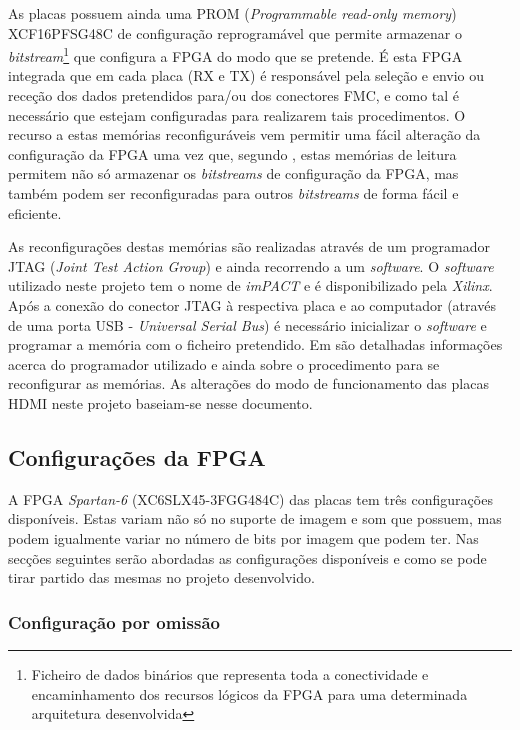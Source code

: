 As placas possuem ainda uma PROM (\textit{Programmable read-only memory}) XCF16PFSG48C de configuração reprogramável que permite armazenar o \textit{bitstream}\footnote{Ficheiro de dados binários que representa toda a conectividade e encaminhamento dos recursos lógicos da FPGA para uma determinada arquitetura desenvolvida} que configura a FPGA do modo que se pretende. É esta FPGA integrada que em cada placa (RX e TX) é responsável pela seleção e envio ou receção dos dados pretendidos para/ou dos conectores FMC, e como tal é necessário que estejam configuradas para realizarem tais procedimentos. O recurso a estas memórias reconfiguráveis vem permitir uma fácil alteração da configuração da FPGA uma vez que, segundo \cite{R026}, estas memórias de leitura permitem não só armazenar os \textit{bitstreams} de configuração da FPGA, mas também podem ser reconfiguradas para outros \textit{bitstreams} de forma fácil e eficiente.

As reconfigurações destas memórias são realizadas através de um programador JTAG (\textit{Joint Test Action Group}) e ainda recorrendo a um \textit{software}. O \textit{software} utilizado neste projeto tem o nome de \textit{imPACT} e é disponibilizado pela \textit{Xilinx}. Após a conexão do conector JTAG à respectiva placa e ao computador (através de uma porta USB - \textit{Universal Serial Bus}) é necessário inicializar o \textit{software} e programar a memória com o ficheiro pretendido. Em \cite{R025} são detalhadas informações acerca do programador utilizado e ainda sobre o procedimento para se reconfigurar as memórias. As alterações do modo de funcionamento das placas HDMI neste projeto baseiam-se nesse documento.

\subsection{Configurações da FPGA} \label{subsec:HDMIconfig}

A FPGA \textit{Spartan-6} (XC6SLX45-3FGG484C) das placas tem três configurações disponíveis. Estas variam não só no suporte de imagem e som que possuem, mas podem igualmente variar no número de bits por imagem que podem ter. Nas secções seguintes serão abordadas as configurações disponíveis e como se pode tirar partido das mesmas no projeto desenvolvido.

\subsubsection{Configuração por omissão} \label{subsubsec:HDMIconfigdefault}

